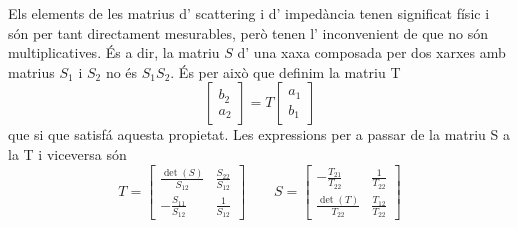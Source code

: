 Els elements de les matrius d' scattering i d' impedància tenen significat físic i són per tant directament mesurables, però tenen l' inconvenient de que no són multiplicatives. És a dir, la matriu $S$ d' una xaxa composada per dos xarxes amb matrius $S_1$ i $S_2$ no és $S_1 S_2$. És per això que definim la matriu T
\begin{equation}
  \left [ \begin{array}{c} b_2 \\ a_2 \end{array}  \right ] = T \left [ \begin{array}{c} a_1 \\ b_1 \end{array} \right ]
\end{equation}
que si que satisfá aquesta propietat. Les expressions per a passar de la matriu S a la T i viceversa són
\begin{equation}
  T = \left [
    \begin{array}{cc}
      \frac{\operatorname{det}(S)}{S_{12}} & \frac{S_{22}}{S_{12}} \\ [1.5ex] 
      - \frac{S_{11}}{S_{12}} & \frac{1}{S_{12}}
    \end{array}
    \right ]
    \qquad
    S = \left [
    \begin{array}{cc}
      - \frac{T_{21}}{T_{22}} & \frac{1}{T_{22}} \\ [1.5ex] 
        \frac{\operatorname{det}(T)}{T_{22}} & \frac{T_{12}}{T_{22}}
    \end{array}
    \right ]
\end{equation}

